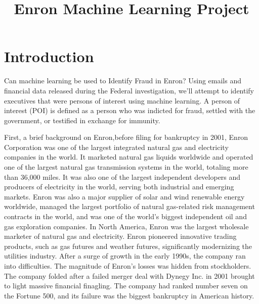 \documentclass{article}
\title{Enron Machine Learning Project}
\begin{document}
    
    
    \maketitle
    
    

    
    \section{Introduction}\label{introduction}

    Can machine learning be used to Identify Fraud in Enron? Using emails
and financial data released during the Federal investigation, we'll
attempt to identify executives that were persons of interest using
machine learning. A person of interest (POI) is defined as a person who
was indicted for fraud, settled with the government, or testified in
exchange for immunity.

First, a brief background on Enron,before filing for bankruptcy in 2001,
Enron Corporation was one of the largest integrated natural gas and
electricity companies in the world. It marketed natural gas liquids
worldwide and operated one of the largest natural gas transmission
systems in the world, totaling more than 36,000 miles. It was also one
of the largest independent developers and producers of electricity in
the world, serving both industrial and emerging markets. Enron was also
a major supplier of solar and wind renewable energy worldwide, managed
the largest portfolio of natural gas-related risk management contracts
in the world, and was one of the world's biggest independent oil and gas
exploration companies. In North America, Enron was the largest wholesale
marketer of natural gas and electricity. Enron pioneered innovative
trading products, such as gas futures and weather futures, significantly
modernizing the utilities industry. After a surge of growth in the early
1990s, the company ran into difficulties. The magnitude of Enron's
losses was hidden from stockholders. The company folded after a failed
merger deal with Dynegy Inc. in 2001 brought to light massive financial
finagling. The company had ranked number seven on the Fortune 500, and
its failure was the biggest bankruptcy in American history.
\end{document}
